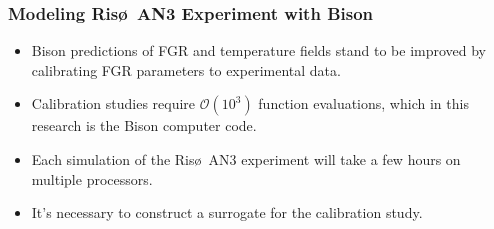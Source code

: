 \begin{frame}
\frametitle{Modeling Ris\o~AN3 Experiment with Bison}

\begin{itemize}
  \item Bison predictions of FGR and temperature fields stand to be improved by calibrating FGR parameters to experimental data.
  \item Calibration studies require $\mathcal{O}(10^3)$ function evaluations, which in this research is the Bison computer code.
  \item Each simulation of the Ris\o~AN3 experiment will take a few hours on multiple processors.
  \item It's necessary to construct a surrogate for the calibration study. 
\end{itemize}

\end{frame}
